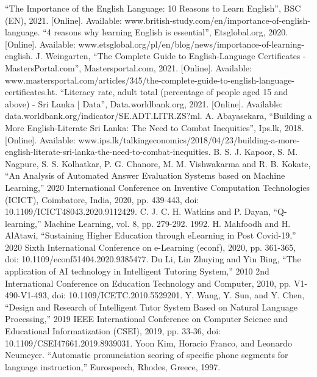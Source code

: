 \documentclass[conference]{IEEEtran}
\begin{document}
\begin{thebibliography}{00}

\raggedright

 ``The Importance of the English Language: 10 Reasons to Learn English'', BSC (EN), 2021. [Online]. Available: www.british-study.com/en/importance-of-english-language.
 ``4 reasons why learning English is essential'', Etsglobal.org, 2020. [Online]. Available: www.etsglobal.org/pl/en/blog/news/importance-of-learning-english.
 J. Weingarten, ``The Complete Guide to English-Language Certificates - MastersPortal.com'', Mastersportal.com, 2021. [Online]. Available: www.mastersportal.com/articles/345/the-complete-guide-to-english-language-certificates.ht.
 ``Literacy rate, adult total (percentage of people aged 15 and above) - Sri Lanka | Data'', Data.worldbank.org, 2021. [Online]. Available: data.worldbank.org/indicator/SE.ADT.LITR.ZS?ml.
 A. Abayasekara, ``Building a More English-Literate Sri Lanka: The Need to Combat Inequities'', Ips.lk, 2018. [Online]. Available: www.ips.lk/talkingeconomics/2018/04/23/building-a-more-english-literate-sri-lanka-the-need-to-combat-inequities.
 B. S. J. Kapoor, S. M. Nagpure, S. S. Kolhatkar, P. G. Chanore, M. M. Vishwakarma and R. B. Kokate, ``An Analysis of Automated Answer Evaluation Systems based on Machine Learning,'' 2020 International Conference on Inventive Computation Technologies (ICICT), Coimbatore, India, 2020, pp. 439-443, doi: 10.1109/ICICT48043.2020.9112429.
 C. J. C. H. Watkins and P. Dayan, ``Q-learning,'' Machine Learning, vol. 8, pp. 279-292. 1992.
 H. Mahfoodh and H. AlAtawi, ``Sustaining Higher Education through eLearning in Post Covid-19,'' 2020 Sixth International Conference on e-Learning (econf), 2020, pp. 361-365, doi: 10.1109/econf51404.2020.9385477.
 Du Li, Lin Zhuying and Yin Bing, ``The application of AI technology in Intelligent Tutoring System,'' 2010 2nd International Conference on Education Technology and Computer, 2010, pp. V1-490-V1-493, doi: 10.1109/ICETC.2010.5529201.
 Y. Wang, Y. Sun, and Y. Chen, ``Design and Research of Intelligent Tutor System Based on Natural Language Processing,'' 2019 IEEE International Conference on Computer Science and Educational Informatization (CSEI), 2019, pp. 33-36, doi: 10.1109/CSEI47661.2019.8939031.
 Yoon Kim, Horacio Franco, and Leonardo Neumeyer. ``Automatic pronunciation scoring of specific phone segments for language instruction,'' Eurospeech, Rhodes, Greece, 1997.

\end{thebibliography}
\end{document}
